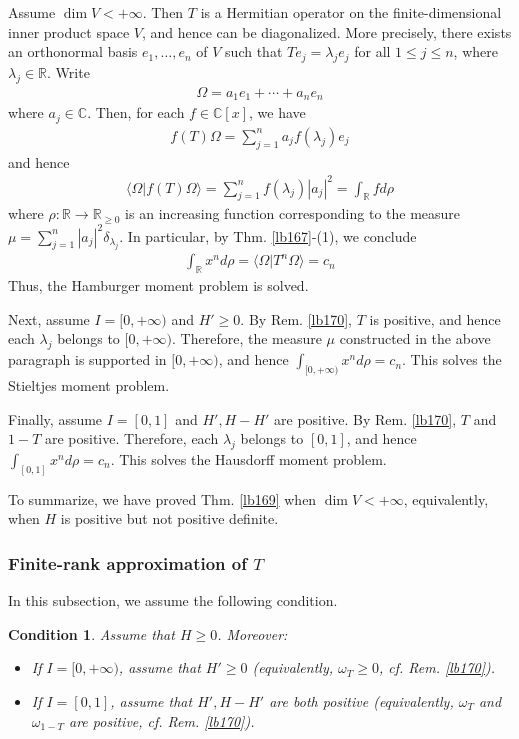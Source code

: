 \documentclass[12pt,b5paper,notitlepage]{article}
\theoremstyle{definition}
\theoremstyle{plain}
\newtheorem{cond}[df]{Condition}
\newcommand{\bk}[1]{\langle {#1}\rangle}
\newcommand{\Cbb}{\mathbb C}
\newcommand{\Rbb}{\mathbb R}
\numberwithin{equation}{section}
\begin{document}
Assume $\dim V<+\infty$. Then $T$ is a Hermitian operator on the finite-dimensional inner product space $V$, and hence can be diagonalized. More precisely, there exists an orthonormal basis $e_1,\dots,e_n$ of $V$ such that $Te_j=\lambda_je_j$ for all $1\leq j\leq n$, where $\lambda_j\in\Rbb$. Write
\begin{align*}
\Omega=a_1e_1+\cdots+a_ne_n
\end{align*}
where $a_j\in\Cbb$. Then, for each $f\in\Cbb[x]$, we have
\begin{align*}
f(T)\Omega=\sum_{j=1}^n a_jf(\lambda_j)e_j
\end{align*}
and hence
\begin{align*}
\bk{\Omega|f(T)\Omega}=\sum_{j=1}^n f(\lambda_j)|a_j|^2=\int_\Rbb fd\rho
\end{align*}
where $\rho:\Rbb\rightarrow\Rbb_{\geq0}$ is an increasing function corresponding to the measure $\mu=\sum_{j=1}^n |a_j|^2\delta_{\lambda_j}$. In particular, by Thm. \ref{lb167}-(1), we conclude
\begin{align*}
\int_\Rbb x^nd\rho=\bk{\Omega|T^n\Omega}=c_n
\end{align*}
Thus, the Hamburger moment problem is solved.

Next, assume $I=[0,+\infty)$ and $H'\geq0$. By Rem. \ref{lb170}, $T$ is positive, and hence each $\lambda_j$ belongs to $[0,+\infty)$. Therefore, the measure $\mu$ constructed in the above paragraph is supported in $[0,+\infty)$, and hence $\int_{[0,+\infty)}x^nd\rho=c_n$. This solves the Stieltjes moment problem.

Finally, assume $I=[0,1]$ and $H',H-H'$ are positive. By Rem. \ref{lb170}, $T$ and $1-T$ are positive. Therefore, each $\lambda_j$ belongs to $[0,1]$, and hence $\int_{[0,1]}x^nd\rho=c_n$. This solves the Hausdorff moment problem.

To summarize, we have proved Thm. \ref{lb169} when $\dim V<+\infty$, equivalently, when $H$ is positive but not positive definite.





\subsubsection{Finite-rank approximation of $T$}\label{lb285}


In this subsection, we assume the following condition.

\begin{cond}\label{lb178}
Assume that $H\geq0$. Moreover:
\begin{itemize}
\item If $I=[0,+\infty)$, assume that $H'\geq0$ (equivalently, $\omega_T\geq0$, cf. Rem. \ref{lb170}).
\item If $I=[0,1]$, assume that $H',H-H'$ are both positive (equivalently, $\omega_T$ and $\omega_{1-T}$ are positive, cf. Rem. \ref{lb170}). 
\end{itemize}
\end{cond}
\end{document}
